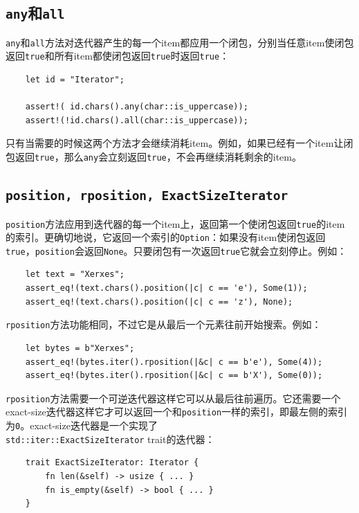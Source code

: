 \subsection{\texttt{any}和\texttt{all}}
\texttt{any}和\texttt{all}方法对迭代器产生的每一个item都应用一个闭包，分别当任意item使闭包返回\texttt{true}和所有item都使闭包返回\texttt{true}时返回\texttt{true}：
\begin{verbatim}
    let id = "Iterator";

    assert!( id.chars().any(char::is_uppercase));
    assert!(!id.chars().all(char::is_uppercase));
\end{verbatim}

只有当需要的时候这两个方法才会继续消耗item。例如，如果已经有一个item让闭包返回\texttt{true}，那么\texttt{any}会立刻返回\texttt{true}，不会再继续消耗剩余的item。

\subsection{\texttt{position, rposition, ExactSizeIterator}}
\texttt{position}方法应用到迭代器的每一个item上，返回第一个使闭包返回\texttt{true}的item的索引。更确切地说，它返回一个索引的\texttt{Option}：如果没有item使闭包返回\texttt{true}，\texttt{position}会返回\texttt{None}。只要闭包有一次返回\texttt{true}它就会立刻停止。例如：
\begin{verbatim}
    let text = "Xerxes";
    assert_eq!(text.chars().position(|c| c == 'e'), Some(1));
    assert_eq!(text.chars().position(|c| c == 'z'), None);
\end{verbatim}

\texttt{rposition}方法功能相同，不过它是从最后一个元素往前开始搜索。例如：
\begin{verbatim}
    let bytes = b"Xerxes";
    assert_eq!(bytes.iter().rposition(|&c| c == b'e'), Some(4));
    assert_eq!(bytes.iter().rposition(|&c| c == b'X'), Some(0));
\end{verbatim}
\texttt{rposition}方法需要一个可逆迭代器这样它可以从最后往前遍历。它还需要一个exact-size迭代器这样它才可以返回一个和\texttt{position}一样的索引，即最左侧的索引为\texttt{0}。exact-size迭代器是一个实现了\\
\texttt{std::iter::ExactSizeIterator} trait的迭代器：
\begin{verbatim}
    trait ExactSizeIterator: Iterator {
        fn len(&self) -> usize { ... }
        fn is_empty(&self) -> bool { ... }
    }
\end{verbatim}

